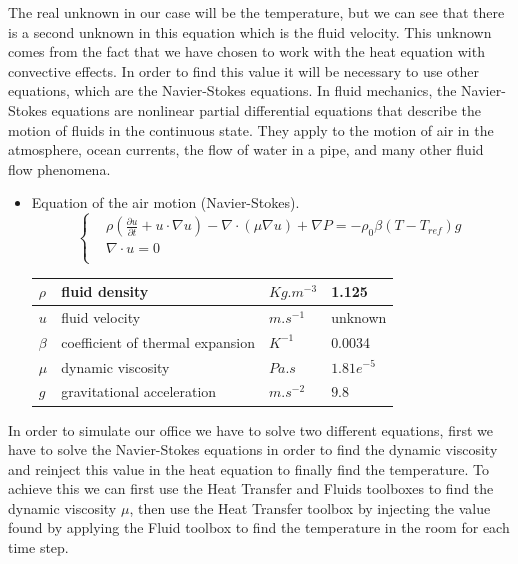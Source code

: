 \noindent The real unknown in our case will be the temperature, but we can see that there is a second unknown in this equation which is the fluid velocity. This unknown comes from the fact that we have chosen to work with the heat equation with convective effects. In order to find this value it will be necessary to use other equations, which are the Navier-Stokes equations.
\newline
\newline \noindent In fluid mechanics, the Navier-Stokes equations are nonlinear partial differential equations that describe the motion of fluids in the continuous state. They apply to the motion of air in the atmosphere, ocean currents, the flow of water in a pipe, and many other fluid flow phenomena. 
\begin{itemize}
\item Equation of the air motion (Navier-Stokes).
 $$\left\{\begin{aligned} 
        &\rho (\frac{\partial u}{\partial t}+u \cdot \nabla u)-\nabla \cdot (\mu \nabla u)+\nabla P =-\rho_0 \beta(T-T_{ref})g\\
        &\nabla \cdot u=0 \\
    \end{aligned}\right.$$
\renewcommand{\arraystretch}{2}
\begin{tabular}{|R{3cm}|C{5cm}|L{3cm}|L{3cm}|}
\hline
$\rho$ & fluid density & $Kg.m^
{-3}$ & 1.125 \\[0.7cm]
\hline
$u$ & fluid velocity & $m.s^{-1}$ & unknown \\[0.7cm]
\hline
$\beta$ & coefficient of thermal expansion & $K^
{-1}$ &  0.0034 \\[0.7cm]
\hline
$\mu$ & dynamic viscosity & $Pa.s$ & $1.81e^{-5}$\\[0.7cm]
\hline
$g$ & gravitational acceleration & $m.s^{-2}$ & $9.8$\\[0.7cm]
\hline
\end{tabular}
\end{itemize}
\noindent 
In order to simulate our office we have to solve two different equations, first we have to solve the Navier-Stokes equations in order to find the dynamic viscosity and reinject this value in the heat equation to finally find the temperature. 
\newline \noindent To achieve this we can first use the Heat Transfer and Fluids toolboxes to find the dynamic viscosity $\mu$, then use the Heat Transfer toolbox by injecting the value found by applying the Fluid toolbox to find the temperature in the room for each time step.
